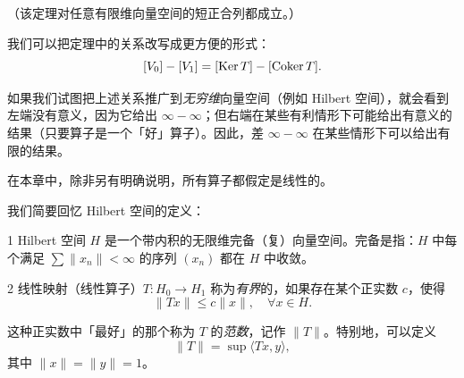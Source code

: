 （该定理对任意有限维向量空间的短正合列都成立。）





我们可以把定理中的关系改写成更方便的形式：
\[ [V_0]-[V_1]=[\operatorname{Ker} T]-[\operatorname{Coker} T]. \]

如果我们试图把上述关系推广到\emph{无穷维}向量空间（例如 Hilbert 空间），就会看到左端没有意义，因为它给出 $\infty-\infty$；但右端在某些有利情形下可能给出有意义的结果（只要算子是一个「好」算子）。因此，差 $\infty-\infty$ 在某些情形下可以给出有限的结果。

在本章中，除非另有明确说明，所有算子都假定是线性的。

我们简要回忆 Hilbert 空间的定义：

\begin{defn}{1} Hilbert 空间 $H$ 是一个带内积的无限维完备（复）向量空间。完备是指：$H$ 中每个满足 $\sum\|x_n\|<\infty$ 的序列 $(x_n)$ 都在 $H$ 中收敛。 \end{defn}

\begin{defn}{2} 线性映射（线性算子）$T:H_0\to H_1$ 称为\emph{有界}的，如果存在某个正实数 $c$，使得
\[ \|Tx\|\le c\|x\|,\quad \forall x\in H. \]
\end{defn}

这种正实数中「最好」的那个称为 $T$ 的\emph{范数}，记作 $\|T\|$。特别地，可以定义
\[ \|T\|=\sup\langle Tx,y\rangle, \]
其中 $\|x\|=\|y\|=1$。


